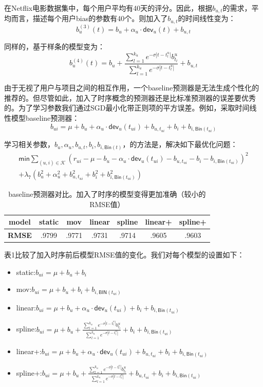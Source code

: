 \documentclass{article}
\begin{document}
 在Netflix电影数据集中，每个用户平均有40天的评分。因此，根据$b_{u,t}$的需求，平均而言，描述每个用户bias的参数有40个。则加入了$b_{u,t}$的时间线性变为：
 $$ b_u^{(3)}(t)=b_u+\alpha_u\cdot\mathsf{dev}_u(t)+b_{u,t} $$

 同样的，基于样条的模型变为：
 $$ b_u^{(4)}(t)=b_u+\frac{\mathop{\sum}_{l=1}^{k_u}e^{-\sigma|t-t_l^u|}b_{t_l}^u}{\mathop{\sum}_{l=1}^{k_u}e^{-\sigma|t-t_l^u|}}+b_{u,t} $$

 由于无视了用户与项目之间的相互作用，一个baseline预测器是无法生成个性化的推荐的。但尽管如此，加入了时序概念的预测器还是比标准预测器的误差要优秀的。为了学习参数我们通过SGD最小化带正则项的平方误差。例如，采取时间线性模型baseline预测器：
 $$ b_{ui}=\mu+b_u+\alpha_u\cdot\mathsf{dev}_u(t_{ui})+b_{u,t_{ui}}+b_i+b_{i,\mathsf{Bin}(t_{ui})} $$

 学习相关参数，$b_u,\alpha_u,b_{u,t},b_i,b_{i,\mathsf{Bin}(t)}$，的方法是，解决如下最优化问题：
 \[ 
 \begin{array}{c}
 \mathsf{min}\mathop{\sum}\limits_{(u,i)\in\mathcal{K}}(r_{ui}-\mu-b_u-\alpha_u\cdot\mathsf{dev}_u(t_{ui})-b_{u,t_{ui}}-b_i-b_{i,\mathsf{Bin}(t_{ui})})^2\\
 +\lambda_7(b_u^2+\alpha_u^2+b_{u,t_{ui}}^2+b_i^2+b_{i,\mathsf{Bin}(t_{ui})}^2) 
 \end{array}
 \]

 \begin{table}[!htb]\label{table1}
 \centering
 \caption{baseline预测器对比。加入了时序的模型变得更加准确（较小的RMSE值）}
 \begin{tabular}{c|c|c|c|c|c|c}
 	\textbf{model} & static & mov & linear & spline & linear+ & spline+ \\\hline
 	\textbf{RMSE} & .9799 & .9771 & .9731 & .9714 & .9605 & .9603 
 \end{tabular}
 \end{table}

 表1比较了加入时序前后模型RMSE值的变化。我们对每个模型的设置如下：
 \begin{itemize}
 \item static:$ b_{ui}=\mu+b_u+b_i $
 \item mov:$ b_{ui}=\mu+b_u+b_i+b_{i,\mathsf{BIN}(t_{ui})} $
 \item linear:$b_{ui}=\mu+b_u+\alpha_u\cdot\mathsf{dev}_u(t_{ui})+b_i+b_{i,\mathsf{Bin}(t_{ui})}$
 \item spline:$b_{ui}=\mu+b_u+\frac{\mathop{\sum}_{l=1}^{k_u}e^{-\sigma|t-t_l^u|}b_{t_l}^u}{\mathop{\sum}_{l=1}^{k_u}e^{-\sigma|t-t_l^u|}}+b_i+b_{i,\mathsf{Bin}(t_{ui})}$
 \item linear+:$ b_{ui}=\mu+b_u+\alpha_u\cdot\mathsf{dev}_u(t_{ui})+b_{u,t_{ui}}+b_i+b_{i,\mathsf{Bin}(t_{ui})} $
 \item spline+:$ b_{ui}=\mu+b_u+\frac{\mathop{\sum}_{l=1}^{k_u}e^{-\sigma|t-t_l^u|}b_{t_l}^u}{\mathop{\sum}_{l=1}^{k_u}e^{-\sigma|t-t_l^u|}}+b_{u,t_{ui}}+b_i+b_{i,\mathsf{Bin}(t_{ui})}$
 \end{itemize}
\end{document}
